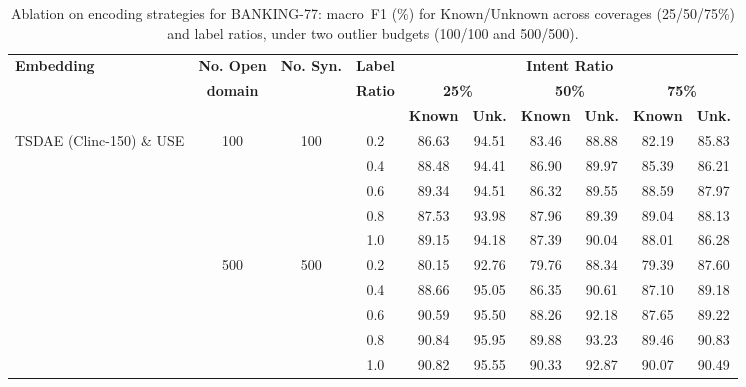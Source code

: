 \documentclass[journal,letterpaper]{IEEEtran}
\begin{document}
\begin{table}[!ht]
\centering
\caption {Ablation on encoding strategies for \textsc{BANKING-77}: macro~F1 (\%) for Known/Unknown across coverages (25/50/75\%) and label ratios, under two outlier budgets (100/100 and 500/500).}
\label{Table:BANKING25-50-75}
\begin{tabular}{l c c c c c c c c c} %
\toprule %

\textbf{Embedding} & \textbf{No. Open} & \textbf{No. Syn.} & \textbf{Label} & \multicolumn{6}{c}{\textbf{Intent Ratio}} \\
\cmidrule(lr){5-10} %
& \textbf{domain} & \textbf{} & \textbf{Ratio} & \multicolumn{2}{c}{\textbf{25\%}} & \multicolumn{2}{c}{\textbf{50\%}} & \multicolumn{2}{c}{\textbf{75\%}} \\
\cmidrule(lr){5-6} \cmidrule(lr){7-8} \cmidrule(lr){9-10} %
& & & & \textbf{Known} & \textbf{Unk.} & \textbf{Known} & \textbf{Unk.} & \textbf{Known} & \textbf{Unk.} \\
\midrule %

\multirow{10}{*}{TSDAE (Clinc-150) \& USE}
& \multirow{5}{*}{100} & \multirow{5}{*}{100} & 0.2 & 86.63 & 94.51 & 83.46 & 88.88 & 82.19 & 85.83 \\
& & & 0.4 & 88.48 & 94.41 & 86.90 & 89.97 & 85.39 & 86.21 \\
& & & 0.6 & 89.34 & 94.51 & 86.32 & 89.55 & 88.59 & 87.97 \\
& & & 0.8 & 87.53 & 93.98 & 87.96 & 89.39 & 89.04 & 88.13 \\
& & & 1.0 & 89.15 & 94.18 & 87.39 & 90.04 & 88.01 & 86.28 \\
\addlinespace %
& \multirow{5}{*}{500} & \multirow{5}{*}{500} & 0.2 & 80.15 & 92.76 & 79.76 & 88.34 & 79.39 & 87.60 \\
& & & 0.4 & 88.66 & 95.05 & 86.35 & 90.61 & 87.10 & 89.18 \\
& & & 0.6 & 90.59 & 95.50 & 88.26 & 92.18 & 87.65 & 89.22 \\
& & & 0.8 & 90.84 & 95.95 & 89.88 & 93.23 & 89.46 & 90.83 \\
& & & 1.0 & 90.82 & 95.55 & 90.33 & 92.87 & 90.07 & 90.49 \\
\midrule


\end{tabular}
\end{table}
\end{document}
